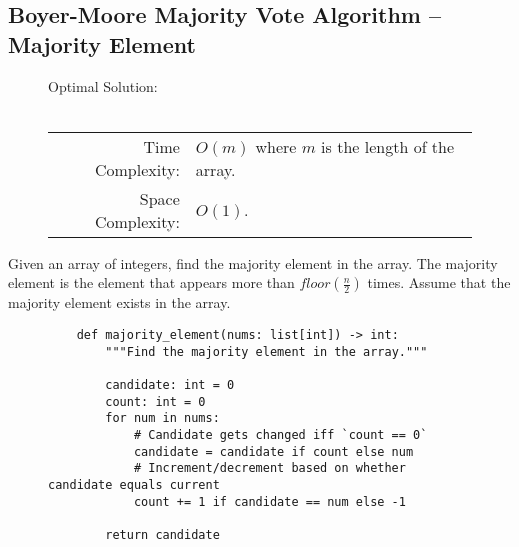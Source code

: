 
\subsection{Boyer-Moore Majority Vote Algorithm -- Majority Element}

\begin{figure}[H]
    Optimal Solution:\\\\
    \begin{tabular}{rl}
        Time Complexity:& \(O(m)\) where \(m\) is the length of the array.\\
        Space Complexity:& \(O(1)\).
    \end{tabular}
\end{figure}

Given an array of integers, find the majority element in the array.
The majority element is the element that appears more than
\(floor(\frac{n}{2})\) times. Assume that the majority element exists
in the array.

\begin{figure}[H]
    \centering
    \begin{verbatim}
    def majority_element(nums: list[int]) -> int:
        """Find the majority element in the array."""

        candidate: int = 0
        count: int = 0
        for num in nums:
            # Candidate gets changed iff `count == 0`
            candidate = candidate if count else num
            # Increment/decrement based on whether candidate equals current
            count += 1 if candidate == num else -1

        return candidate
    \end{verbatim}
\end{figure}
